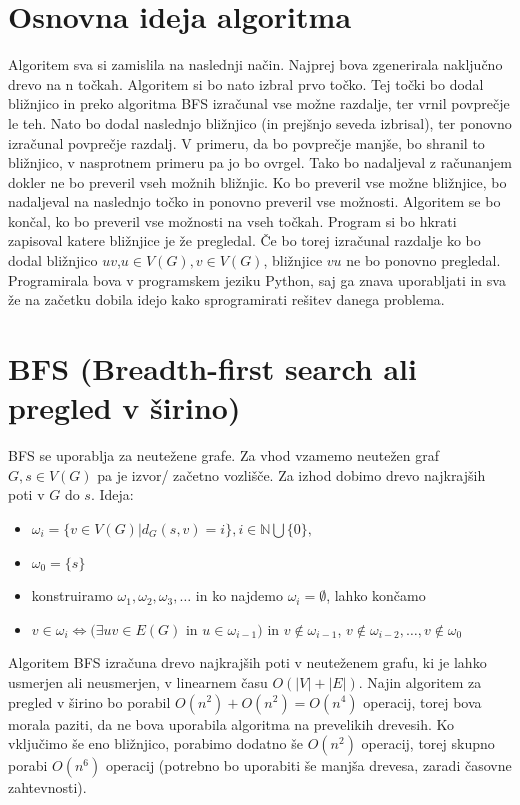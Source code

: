 \documentclass[a4paper,10pt]{article}
\begin{document}
\section{Osnovna ideja algoritma}
Algoritem sva si zamislila na naslednji način. Najprej bova zgenerirala naključno drevo na n točkah. Algoritem si bo nato izbral prvo točko. Tej točki bo dodal bližnjico in preko algoritma BFS izračunal vse možne razdalje, ter vrnil povprečje le teh. Nato bo dodal naslednjo bližnjico (in prejšnjo seveda izbrisal), ter ponovno izračunal povprečje razdalj. V primeru, da bo povprečje manjše, bo shranil to bližnjico, v nasprotnem primeru pa jo bo ovrgel. Tako bo nadaljeval z računanjem dokler ne bo preveril vseh možnih bližnjic. Ko bo preveril vse možne bližnjice, bo nadaljeval na naslednjo točko in ponovno preveril vse možnosti. Algoritem se bo končal, ko bo preveril vse možnosti na vseh točkah. 
\newline
Program si bo hkrati zapisoval katere bližnjice je že pregledal. Če bo torej izračunal razdalje ko bo dodal bližnjico $uv$,$u \in V(G),v\in V(G)$, bližnjice $vu$ ne bo ponovno pregledal.
\newline
Programirala bova v programskem jeziku Python, saj ga znava uporabljati in sva že na začetku dobila idejo kako sprogramirati rešitev danega problema.

\section{BFS (Breadth-first search ali pregled v širino)}
BFS se uporablja za neutežene grafe. Za vhod vzamemo neutežen graf $G, s\in V(G)$ pa je izvor/ začetno vozlišče. Za izhod dobimo drevo najkrajših poti v $G$ do $s$.
Ideja:
\begin{itemize}
\item $\omega_i = \lbrace v\in V(G) \vert d_G (s,v)=i \rbrace, i\in \mathbb{N} \bigcup \lbrace0\rbrace,$
\item $\omega_0=\lbrace s\rbrace$
\item konstruiramo $\omega_1 ,\omega_2,\omega_3,\dotsc $  in ko najdemo $\omega_i= \emptyset $, lahko končamo
\item $ v\in \omega_i \Leftrightarrow (\exists uv\in E(G)$  in $ u\in \omega_{i-1} )$  in $v \notin \omega_{i-1 }$, $v \notin \omega_{i-2 },\dotsc ,v \notin \omega_{0}$
\end{itemize}
Algoritem BFS izračuna drevo najkrajših poti v neuteženem grafu, ki je lahko usmerjen ali neusmerjen, v linearnem času $O(|V|+ |E|)$.
\newline
Najin algoritem za pregled v širino bo porabil $O(n^2)+ O(n^2)= O(n^4)$ operacij, torej bova morala paziti, da ne bova uporabila algoritma na prevelikih drevesih. Ko vključimo še eno bližnjico, porabimo dodatno še $O(n^2)$ operacij, torej skupno porabi $O(n^6)$ operacij (potrebno bo uporabiti še manjša drevesa, zaradi časovne zahtevnosti).
\end{document}
